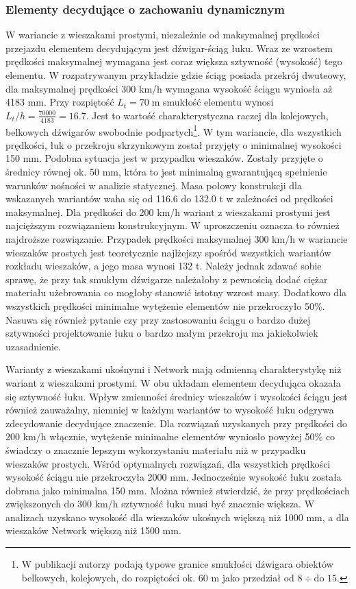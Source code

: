 \subsubsection{Elementy decydujące o zachowaniu dynamicznym}
W wariancie z wieszakami prostymi, niezależnie od maksymalnej prędkości przejazdu elementem decydującym jest dźwigar-ściąg łuku. Wraz ze wzrostem prędkości maksymalnej wymagana jest coraz większa sztywność (wysokość) tego elementu. W rozpatrywanym przykładzie gdzie ściąg posiada przekrój dwuteowy, dla maksymalnej prędkości 300 km/h wymagana wysokość ściągu wyniosła aż 4183 mm. Przy rozpiętość $L_t=70\;\mathrm{m}$ smukłość elementu wynosi $L_t/h=\frac{70 000}{4183}=16.7$. Jest to wartość charakterystyczna raczej dla kolejowych, belkowych dźwigarów swobodnie podpartych\footnote{
		W publikacji \cite{Madaj2009} autorzy podają typowe granice smukłości dźwigara obiektów belkowych, kolejowych, do rozpiętości ok. 60 m jako przedział od $8 \div \text{do } 15$.}. 
W tym wariancie, dla wszystkich prędkości, łuk o przekroju skrzynkowym został przyjęty o minimalnej wysokości 150 mm. Podobna sytuacja jest w przypadku wieszaków. Zostały przyjęte o średnicy równej ok. 50 mm, która to jest minimalną gwarantującą spełnienie warunków nośności w analizie statycznej. Masa połowy konstrukcji dla wskazanych wariantów waha się od 116.6 do 132.0 t w zależności od prędkości maksymalnej. Dla prędkości do 200 km/h wariant z wieszakami prostymi jest najcięższym rozwiązaniem konstrukcyjnym. W uproszczeniu oznacza to również najdroższe rozwiązanie. Przypadek prędkości maksymalnej 300 km/h w wariancie wieszaków prostych jest teoretycznie najlżejszy spośród wszystkich wariantów rozkładu wieszaków, a jego masa wynosi 132 t. Należy jednak zdawać sobie sprawę, że przy tak smukłym dźwigarze należałoby z pewnością dodać ciężar materiału użebrowania co mogłoby stanowić istotny wzrost masy. Dodatkowo dla wszystkich prędkości minimalne wytężenie elementów nie przekroczyło 50\%. Nasuwa się również pytanie czy przy zastosowaniu ściągu o bardzo dużej sztywności projektowanie łuku o bardzo małym przekroju ma jakiekolwiek uzasadnienie. 


Warianty z wieszakami ukośnymi i Network mają odmienną charakterystykę niż wariant z wieszakami prostymi. W obu układam elementem decydująca okazała się sztywność łuku. Wpływ zmienności średnicy wieszaków i wysokości ściągu jest również zauważalny, niemniej w każdym wariantów to wysokość łuku odgrywa zdecydowanie decydujące znaczenie. Dla rozwiązań uzyskanych przy prędkości do 200 km/h włącznie, wytężenie minimalne elementów wyniosło powyżej 50\% co świadczy o znacznie lepszym wykorzystaniu materiału niż w przypadku wieszaków prostych. Wśród optymalnych rozwiązań, dla wszystkich prędkości wysokość ściągu nie przekroczyła 2000 mm. Jednocześnie wysokość łuku została dobrana jako minimalna 150 mm. Można również stwierdzić, że przy prędkościach zwiększonych do 300 km/h sztywność łuku musi być znacznie większa. W analizach uzyskano wysokość dla wieszaków ukośnych większą niż 1000 mm, a dla wieszaków Network większą niż 1500 mm.

